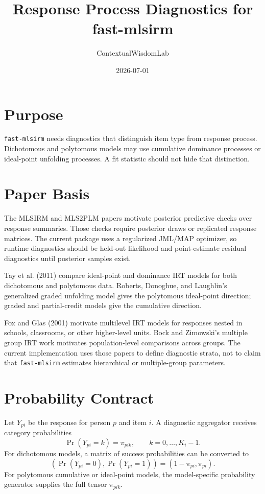 \documentclass[11pt]{article}
\title{Response Process Diagnostics for fast-mlsirm}
\author{ContextualWisdomLab}
\date{2026-07-01}
\begin{document}
\maketitle

\section{Purpose}

\texttt{fast-mlsirm} needs diagnostics that distinguish item type from
response process. Dichotomous and polytomous models may use cumulative
dominance processes or ideal-point unfolding processes. A fit statistic should
not hide that distinction.

\section{Paper Basis}

The MLSIRM and MLS2PLM papers motivate posterior predictive checks over
response summaries. Those checks require posterior draws or replicated response
matrices. The current package uses a regularized JML/MAP optimizer, so runtime
diagnostics should be held-out likelihood and point-estimate residual
diagnostics until posterior samples exist.

Tay et al. (2011) compare ideal-point and dominance IRT models for both
dichotomous and polytomous data. Roberts, Donoghue, and Laughlin's generalized
graded unfolding model gives the polytomous ideal-point direction; graded and
partial-credit models give the cumulative direction.

Fox and Glas (2001) motivate multilevel IRT models for responses nested in
schools, classrooms, or other higher-level units. Bock and Zimowski's multiple
group IRT work motivates population-level comparisons across groups. The
current implementation uses those papers to define diagnostic strata, not to
claim that \texttt{fast-mlsirm} estimates hierarchical or multiple-group
parameters.

\section{Probability Contract}

Let $Y_{pi}$ be the response for person $p$ and item $i$. A diagnostic
aggregator receives category probabilities
\[
  \Pr(Y_{pi}=k) = \pi_{pik}, \qquad k=0,\dots,K_i-1.
\]
For dichotomous models, a matrix of success probabilities can be converted to
\[
  (\Pr(Y_{pi}=0), \Pr(Y_{pi}=1)) = (1-\pi_{pi}, \pi_{pi}).
\]
For polytomous cumulative or ideal-point models, the model-specific probability
generator supplies the full tensor $\pi_{pik}$.
\end{document}
